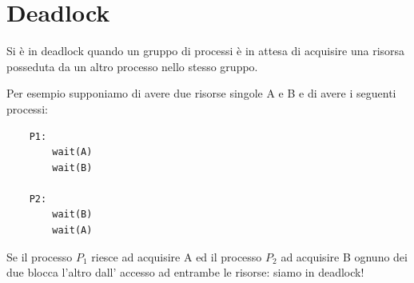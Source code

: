 \section{Deadlock}
Si è in deadlock quando un gruppo di processi è in attesa di acquisire una risorsa posseduta da un altro processo nello stesso gruppo.

Per esempio supponiamo di avere due risorse singole A e B e di avere i seguenti processi:
\begin{verbatim}
    P1:
        wait(A)
        wait(B)
    
    P2:
        wait(B)
        wait(A)
\end{verbatim}
Se il processo $P_1$ riesce ad acquisire A ed il processo $P_2$ ad acquisire B ognuno dei due blocca l'altro dall' accesso ad entrambe le risorse: siamo in deadlock!


